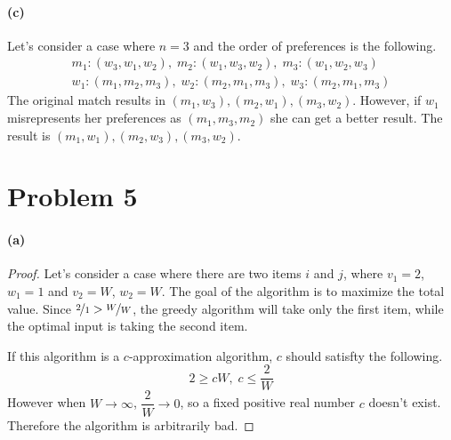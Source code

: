 \documentclass[10pt]{article}
\begin{document}
\paragraph{(c)} Let's consider a case where $n=3$ and the order of preferences is the following.
\begin{gather*}
    m_1 : (w_3, w_1, w_2),\; m_2 : (w_1, w_3, w_2),\; m_3 : (w_1, w_2, w_3) \\
    w_1 : (m_1, m_2, m_3),\; w_2 : (m_2, m_1, m_3),\; w_3 : (m_2, m_1, m_3)
\end{gather*}
The original match results in $(m_1, w_3), (m_2, w_1), (m_3, w_2)$.
However, if $w_1$ misrepresents her preferences as $(m_1, m_3, m_2)$ she can get a better result.
The result is $(m_1, w_1), (m_2, w_3), (m_3, w_2)$.

\section*{Problem 5}
\paragraph{(a)} 
\begin{proof}
    Let's consider a case where there are two items $i$ and $j$, where $v_1 = 2$, $w_1 = 1$ and $v_2 = W$, $w_2 = W$.
    The goal of the algorithm is to maximize the total value.
    Since $\nicefrac{2}{1} > \nicefrac{W}{W}$, the greedy algorithm will take only the first item, while the optimal input is taking the second item.

    \vspace{0.3cm} If this algorithm is a $c$-approximation algorithm, $c$ should satisfty the following.
    $$2 \geq cW, \; c \leq \frac{2}{W}$$
    However when $W \to \infty$, $\dfrac{2}{W} \to 0$, so a fixed positive real number $c$ doesn't exist. 
    Therefore the algorithm is arbitrarily bad.

\end{proof}
\end{document}
